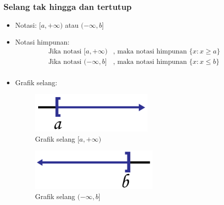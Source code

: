 \documentclass[pdflatex,compress,mathserif]{beamer}
\begin{document}
		\begin{frame}
			\frametitle{Selang tak hingga dan tertutup}
			\begin{itemize}
				\item Notasi: $ [a,+\infty) $ atau $ (-\infty,b] $
				\item Notasi himpunan:
				\begin{align*}
					\text{Jika notasi } [a,+\infty) & \text{, maka notasi himpunan }\{x:x \geq a\} \\
					\text{Jika notasi } (-\infty,b] & \text{, maka notasi himpunan }\{x: x \leq b\} \\
				\end{align*}
				\item Grafik selang:
				\begin{multicols}{2}
					\begin{figure}
						\centering
						\includegraphics[width=0.5\linewidth]{pict/06}
						\caption{Grafik selang $[a,+\infty)$}
						\label{fig:06}
					\end{figure}
					\columnbreak
					\begin{figure}
						\centering
						\includegraphics[width=0.5\linewidth]{pict/07}
						\caption{Grafik selang $(-\infty,b]$}
						\label{fig:07}
					\end{figure}
				\end{multicols}
			\end{itemize}
		\end{frame}
	
\end{document}
